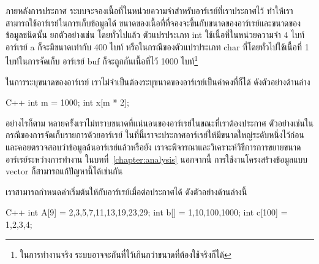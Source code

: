 ภายหลัง{\wbr}การ{\wbr}ประกาศ ระบบ{\wbr}จะ{\wbr}จอง{\wbr}เนื้อที่{\wbr}ใน{\wbr}หน่วย{\wbr}ความ{\wbr}จำ{\wbr}สำหรับ{\wbr}อาร์{\wbr}เรย์{\wbr}ที่{\wbr}เรา{\wbr}ประกาศ{\wbr}ไว้{\wbr}
ทำให้{\wbr}เรา{\wbr}สามารถ{\wbr}ใช้{\wbr}อาร์{\wbr}เรย์{\wbr}ใน{\wbr}การ{\wbr}เก็บ{\wbr}ข้อมูล{\wbr}ได้{\wbr}
ขนาด{\wbr}ของ{\wbr}เนื้อที่{\wbr}ที่{\wbr}จอง{\wbr}จะ{\wbr}ขึ้น{\wbr}กับ{\wbr}ขนาด{\wbr}ของ{\wbr}อาร์{\wbr}เรย์{\wbr}และ{\wbr}ขนาด{\wbr}ของ{\wbr}ข้อมูล{\wbr}ชนิด{\wbr}นั้น ยก{\wbr}ตัวอย่าง{\wbr}เช่น{\wbr}
โดย{\wbr}ทั่วไป{\wbr}แล้ว ตัวแปร{\wbr}ประเภท {\ct int} ใช้{\wbr}เนื้อที่{\wbr}ใน{\wbr}หน่วย{\wbr}ความ{\wbr}จำ 4 ไบท์ อาร์{\wbr}เรย์ {\ct
  a} ก็{\wbr}จะ{\wbr}มี{\wbr}ขนาด{\wbr}เท่ากับ 400 ไบท์ หรือ{\wbr}ใน{\wbr}กรณี{\wbr}ของ{\wbr}ตัวแปร{\wbr}ประเภท {\ct char}
ที่{\wbr}โดย{\wbr}ทั่วไป{\wbr}ใช้{\wbr}เนื้อที่ 1 ไบท์ใน{\wbr}การ{\wbr}จัด{\wbr}เก็บ อาร์{\wbr}เรย์ {\ct buf} ก็{\wbr}จะ{\wbr}ถูก{\wbr}กัน{\wbr}เนื้อที่{\wbr}ไว้ 1000
ไบท์\footnote{ใน{\wbr}การ{\wbr}ทำงาน{\wbr}จริง ระบบ{\wbr}อาจ{\wbr}จะ{\wbr}กัน{\wbr}ที่{\wbr}ไว้{\wbr}เกิน{\wbr}กว่า{\wbr}ขนาด{\wbr}ที่{\wbr}ต้อง{\wbr}ใช้{\wbr}จริง{\wbr}ก็{\wbr}ได้}

ใน{\wbr}การ{\wbr}ระบุ{\wbr}ขนาด{\wbr}ของ{\wbr}อาร์{\wbr}เรย์ เรา{\wbr}ไม่{\wbr}จำเป็น{\wbr}ต้อง{\wbr}ระบุ{\wbr}ขนาด{\wbr}ของ{\wbr}อาร์{\wbr}เรย์{\wbr}เป็น{\wbr}ค่า{\wbr}คงที่{\wbr}ก็{\wbr}ได้ ดัง{\wbr}ตัวอย่าง{\wbr}ด้าน{\wbr}ล่าง{\wbr}

\latintext
\begin{codelist}{C++}{}
int m = 1000;
int x[m * 2];
\end{codelist}
\thaitext

อย่างไร{\wbr}ก็{\wbr}ตาม หลาย{\wbr}ครั้ง{\wbr}เรา{\wbr}ไม่{\wbr}ทราบ{\wbr}ขนาด{\wbr}ที่{\wbr}แน่นอน{\wbr}ของ{\wbr}อาร์{\wbr}เรย์{\wbr}ใน{\wbr}ขณะ{\wbr}ที่{\wbr}เรา{\wbr}ต้อง{\wbr}ประกาศ{\wbr}
ตัวอย่าง{\wbr}เช่น{\wbr}ใน{\wbr}กรณี{\wbr}ของ{\wbr}การ{\wbr}จัด{\wbr}เก็บ{\wbr}รายการ{\wbr}ด้วย{\wbr}อาร์{\wbr}เรย์
ใน{\wbr}ที่{\wbr}นี้{\wbr}เรา{\wbr}จะ{\wbr}ประกาศ{\wbr}อาร์{\wbr}เรย์{\wbr}ให้{\wbr}มี{\wbr}ขนาด{\wbr}ใหญ่{\wbr}ระดับ{\wbr}หนึ่ง{\wbr}ไว้{\wbr}ก่อน{\wbr}
และ{\wbr}คอย{\wbr}ตรวจสอบ{\wbr}ว่า{\wbr}ข้อมูล{\wbr}ล้น{\wbr}อาร์{\wbr}เรย์{\wbr}แล้ว{\wbr}หรือ{\wbr}ยัง{\wbr}
เรา{\wbr}จะ{\wbr}พิจารณา{\wbr}และ{\wbr}วิเคราะห์{\wbr}วิธีการ{\wbr}การ{\wbr}ขยาย{\wbr}ขนาด{\wbr}อาร์{\wbr}เรย์{\wbr}ระหว่าง{\wbr}การ{\wbr}ทำงาน{\wbr}
ใน{\wbr}บท{\wbr}ที่~\ref{chapter:analysis} นอกจาก{\wbr}นี้ การ{\wbr}ใช้งาน{\wbr}โครงสร้าง{\wbr}ข้อมูล{\wbr}แบบ {\ct
  vector} ก็{\wbr}สามารถ{\wbr}แก้{\wbr}ปัญหา{\wbr}นี้{\wbr}ได้{\wbr}เช่น{\wbr}กัน{\wbr}

เรา{\wbr}สามารถ{\wbr}กำหนด{\wbr}ค่า{\wbr}เริ่มต้น{\wbr}ให้{\wbr}กับ{\wbr}อาร์{\wbr}เรย์{\wbr}เมื่อ{\wbr}ต่อ{\wbr}ประกาศ{\wbr}ได้ ดัง{\wbr}ตัวอย่าง{\wbr}ด้าน{\wbr}ล่าง{\wbr}นี้{\wbr}
\latintext
\begin{codelist}{C++}{}
  int A[9] = {2,3,5,7,11,13,19,23,29};
  int b[] = {1,10,100,1000};
  int c[100] = {1,2,3,4};
\end{codelist}
\thaitext

